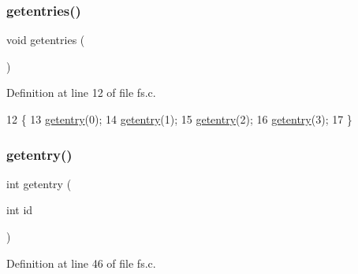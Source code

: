 \subsubsection{\texorpdfstring{getentries()}{getentries()}}
{\footnotesize\ttfamily void getentries (\begin{DoxyParamCaption}{ }\end{DoxyParamCaption})}



Definition at line 12 of file fs.\+c.


\begin{DoxyCode}
12                   \{
13     \hyperlink{a00149_a3fb32d07d3bd05144a196c94fc59c0d1_a3fb32d07d3bd05144a196c94fc59c0d1}{getentry}(0);
14     \hyperlink{a00149_a3fb32d07d3bd05144a196c94fc59c0d1_a3fb32d07d3bd05144a196c94fc59c0d1}{getentry}(1);
15     \hyperlink{a00149_a3fb32d07d3bd05144a196c94fc59c0d1_a3fb32d07d3bd05144a196c94fc59c0d1}{getentry}(2);
16     \hyperlink{a00149_a3fb32d07d3bd05144a196c94fc59c0d1_a3fb32d07d3bd05144a196c94fc59c0d1}{getentry}(3);
17 \}
\end{DoxyCode}
\mbox{\label{a00152_a3fb32d07d3bd05144a196c94fc59c0d1_a3fb32d07d3bd05144a196c94fc59c0d1}} 
\subsubsection{\texorpdfstring{getentry()}{getentry()}}
{\footnotesize\ttfamily int getentry (\begin{DoxyParamCaption}\item[{int}]{id }\end{DoxyParamCaption})}



Definition at line 46 of file fs.\+c.


